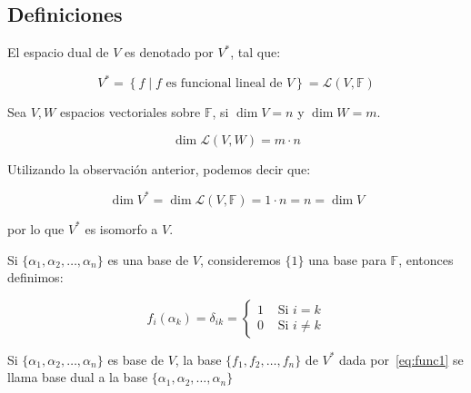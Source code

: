	\subsection{Definiciones}

		\begin{definicion}
			El espacio dual de $V$ es denotado por $V^*$, tal que:

			\begin{equation}
				V^* = \left\{ f \mid f \text{ es funcional lineal de } V \right\} = \mathcal{L}(V, \mathbb{F})
			\end{equation}
		\end{definicion}

		\begin{observacion}
			Sea $V, W$ espacios vectoriales sobre $\mathbb{F}$, si $\dim{V} = n$ y $\dim{W} = m$.

			\begin{equation}
				\dim{\mathcal{L}(V, W)} = m \cdot n
			\end{equation}
		\end{observacion}

		\begin{observacion}
			Utilizando la observación anterior, podemos decir que:

			\begin{equation} 
				\dim{V^*} = \dim{\mathcal{L}(V, \mathbb{F})} = 1 \cdot n = n = \dim{V}
			\end{equation}

			por lo que $V^*$ es isomorfo a $V$.
		\end{observacion}

		\begin{definicion}
			Si $\{ \alpha_1, \alpha_2, \dots, \alpha_n \}$ es una base de $V$, consideremos $\{1\}$ una base para $\mathbb{F}$, entonces definimos:

			\begin{equation} \label{eq:func1}
				f_i(\alpha_k) = \delta_{ik} =
				\begin{cases}
					1 & \text{ Si } i = k \\
					0 & \text{ Si } i \ne k
				\end{cases}
			\end{equation}
		\end{definicion}

		\begin{definicion}
			Si $\{ \alpha_1, \alpha_2, \dots, \alpha_n \}$ es base de $V$, la base $\{ f_1, f_2, \dots, f_n \}$ de $V^*$ dada por~\ref{eq:func1} se llama base dual a la base $\{ \alpha_1, \alpha_2, \dots, \alpha_n \}$
		\end{definicion}

